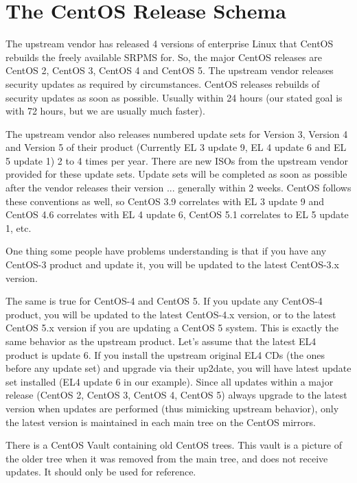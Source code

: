     \section{The CentOS Release Schema}
\hypertarget{sec:Concepts:CentOS:Release}{}
      \label{sec:Concepts:CentOS:Release}

The upstream vendor has released 4 versions of enterprise Linux that
CentOS rebuilds the freely available SRPMS for. So, the major CentOS
releases are CentOS 2, CentOS 3, CentOS 4 and CentOS 5.  The upstream
vendor releases security updates as required by circumstances. CentOS
releases rebuilds of security updates as soon as possible. Usually
within 24 hours (our stated goal is with 72 hours, but we are usually
much faster).

The upstream vendor also releases numbered update sets for Version 3,
Version 4 and Version 5 of their product (Currently EL 3 update 9, EL
4 update 6 and EL 5 update 1) 2 to 4 times per year. There are new
ISOs from the upstream vendor provided for these update sets. Update
sets will be completed as soon as possible after the vendor releases
their version ... generally within 2 weeks. CentOS follows these
conventions as well, so CentOS 3.9 correlates with EL 3 update 9 and
CentOS 4.6 correlates with EL 4 update 6, CentOS 5.1 correlates to EL
5 update 1, etc.

One thing some people have problems understanding is that if you have
any CentOS-3 product and update it, you will be updated to the latest
CentOS-3.x version.

The same is true for CentOS-4 and CentOS 5. If you update any CentOS-4
product, you will be updated to the latest CentOS-4.x version, or to
the latest CentOS 5.x version if you are updating a CentOS 5 system.
This is exactly the same behavior as the upstream product. Let's
assume that the latest EL4 product is update 6. If you install the
upstream original EL4 CDs (the ones before any update set) and upgrade
via their up2date, you will have latest update set installed (EL4
update 6 in our example). Since all updates within a major release
(CentOS 2, CentOS 3, CentOS 4, CentOS 5) always upgrade to the latest
version when updates are performed (thus mimicking upstream behavior),
only the latest version is maintained in each main tree on the CentOS
mirrors.

There is a CentOS Vault containing old CentOS trees. This vault is a
picture of the older tree when it was removed from the main tree, and
does not receive updates. It should only be used for reference. 

